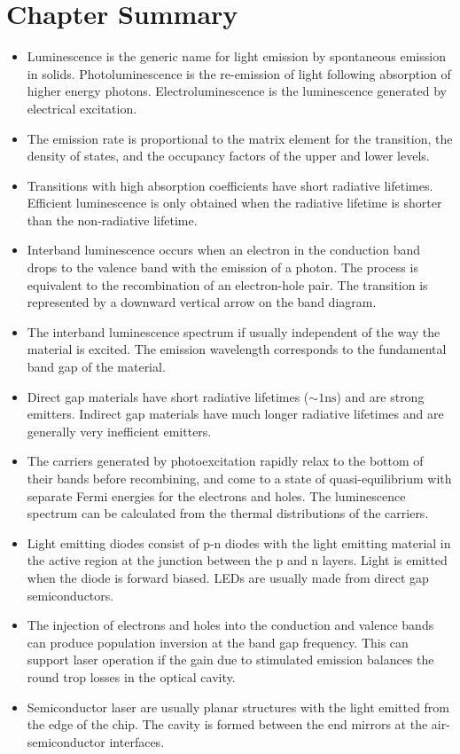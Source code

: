 \documentclass[12pt]{book}
\begin{document}
\section*{Chapter Summary}
\begin{shaded}
\begin{itemize}
  \item Luminescence is the generic name for light emission by spontaneous emission in solids. Photoluminescence is the re-emission of light following absorption of higher energy photons. Electroluminescence is the luminescence generated by electrical excitation.
  \item The emission rate is proportional to the matrix element for the transition, the density of states, and the occupancy factors of the upper and lower levels.
  \item Transitions with high absorption coefficients have short radiative lifetimes. Efficient luminescence is only obtained when the radiative lifetime is shorter than the non-radiative lifetime.
  \item Interband luminescence occurs when an electron in the conduction band drops to the valence band with the emission of a photon. The process is equivalent to the recombination of an electron-hole pair. The transition is represented by a downward vertical arrow on the band diagram.
  \item The interband luminescence spectrum if usually independent of the way the material is excited. The emission wavelength corresponds to the fundamental band gap of the material.
  \item Direct gap materials have short radiative lifetimes ($\sim 1 \mathrm{ns}$) and are strong emitters. Indirect gap materials have much longer radiative lifetimes and are generally very inefficient emitters.
  \item The carriers generated by photoexcitation rapidly relax to the bottom of their bands before recombining, and come to a state of quasi-equilibrium with separate Fermi energies for the electrons and holes. The luminescence spectrum can be calculated from the thermal distributions of the carriers.
  \item Light emitting diodes consist of p-n diodes with the light emitting material in the  active region at the junction between the p and n layers. Light is emitted when the diode is forward biased. LEDs are usually made from direct gap semiconductors.
  \item The injection of electrons and holes into the conduction and valence bands can produce population inversion at the band gap frequency. This can support laser operation if the gain due to stimulated emission balances the round trop losses in the optical cavity.
  \item Semiconductor laser are usually planar structures with the light emitted from the edge of the chip. The cavity is formed between the end mirrors at the air-semiconductor interfaces.
\end{itemize}
\end{shaded}
\end{document}

